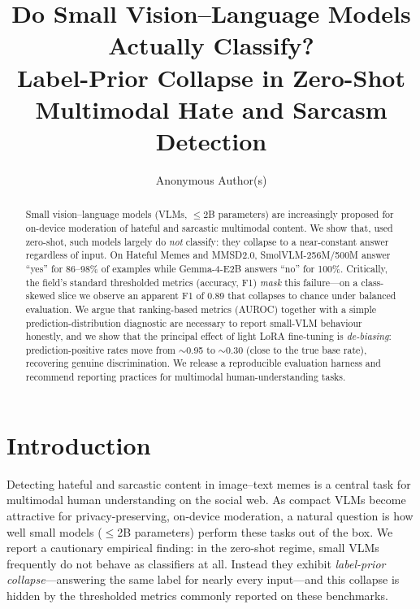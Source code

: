 \documentclass[sigconf,nonacm]{acmart}
\begin{document}
\title{Do Small Vision--Language Models Actually Classify?\\
Label-Prior Collapse in Zero-Shot Multimodal Hate and Sarcasm Detection}

\author{Anonymous Author(s)}

\begin{abstract}
Small vision--language models (VLMs, $\leq$2B parameters) are increasingly proposed for
on-device moderation of hateful and sarcastic multimodal content. We show that, used
zero-shot, such models largely do \emph{not} classify: they collapse to a near-constant
answer regardless of input. On Hateful Memes and MMSD2.0, SmolVLM-256M/500M answer
``yes'' for 86--98\% of examples while Gemma-4-E2B answers ``no'' for 100\%. Critically,
the field's standard thresholded metrics (accuracy, F1) \emph{mask} this failure---on a
class-skewed slice we observe an apparent F1 of 0.89 that collapses to chance under
balanced evaluation. We argue that ranking-based metrics (AUROC) together with a simple
prediction-distribution diagnostic are necessary to report small-VLM behaviour honestly,
and we show that the principal effect of light LoRA fine-tuning is \emph{de-biasing}:
prediction-positive rates move from $\sim$0.95 to $\sim$0.30 (close to the true base
rate), recovering genuine discrimination. We release a reproducible evaluation harness
and recommend reporting practices for multimodal human-understanding tasks.
\end{abstract}


\maketitle

\section{Introduction}
Detecting hateful and sarcastic content in image--text memes is a central task for
multimodal human understanding on the social web. As compact VLMs become attractive for
privacy-preserving, on-device moderation, a natural question is how well small models
($\leq$2B parameters) perform these tasks out of the box. We report a cautionary
empirical finding: in the zero-shot regime, small VLMs frequently do not behave as
classifiers at all. Instead they exhibit \emph{label-prior collapse}---answering the
same label for nearly every input---and this collapse is hidden by the thresholded
metrics commonly reported on these benchmarks.
\end{document}
